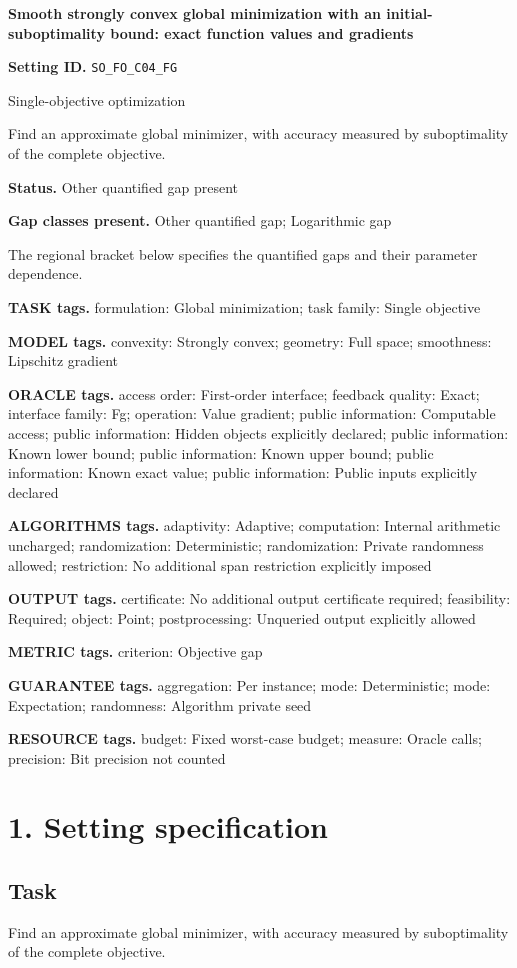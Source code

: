 \documentclass[10pt,a4paper]{article}
\begin{document}
\raggedright

{\LARGE\bfseries\sffamily\color{AtlasNavy} Smooth strongly convex global minimization with an initial-suboptimality bound: exact function values and gradients\par}\vspace{5pt}
\textbf{Setting ID.} \texttt{SO\_\allowbreak{}FO\_\allowbreak{}C04\_\allowbreak{}FG}

Single-objective optimization

Find an approximate global minimizer, with accuracy measured by suboptimality of the complete objective.

\textbf{Status.} Other quantified gap present

\textbf{Gap classes present.} Other quantified gap; Logarithmic gap

The regional bracket below specifies the quantified gaps and their parameter dependence.

\textbf{TASK tags.} formulation: Global minimization; task family: Single objective

\textbf{MODEL tags.} convexity: Strongly convex; geometry: Full space; smoothness: Lipschitz gradient

\textbf{ORACLE tags.} access order: First-order interface; feedback quality: Exact; interface family: Fg; operation: Value gradient; public information: Computable access; public information: Hidden objects explicitly declared; public information: Known lower bound; public information: Known upper bound; public information: Known exact value; public information: Public inputs explicitly declared

\textbf{ALGORITHMS tags.} adaptivity: Adaptive; computation: Internal arithmetic uncharged; randomization: Deterministic; randomization: Private randomness allowed; restriction: No additional span restriction explicitly imposed

\textbf{OUTPUT tags.} certificate: No additional output certificate required; feasibility: Required; object: Point; postprocessing: Unqueried output explicitly allowed

\textbf{METRIC tags.} criterion: Objective gap

\textbf{GUARANTEE tags.} aggregation: Per instance; mode: Deterministic; mode: Expectation; randomness: Algorithm private seed

\textbf{RESOURCE tags.} budget: Fixed worst-case budget; measure: Oracle calls; precision: Bit precision not counted

\section{1. Setting specification}
\subsection{Task}
Find an approximate global minimizer, with accuracy measured by suboptimality of the complete objective.
\end{document}
